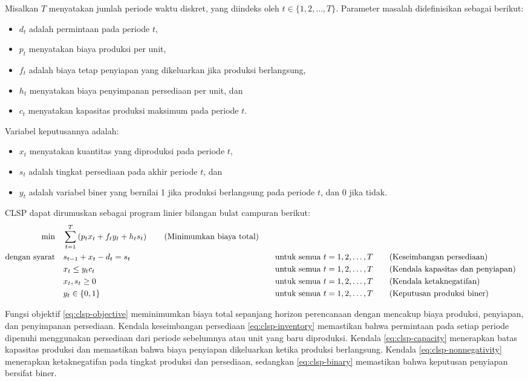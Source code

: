 Misalkan \( T \) menyatakan jumlah periode waktu diskret, yang diindeks oleh \( t \in \{1,2,\dots,T\} \). Parameter masalah didefinisikan sebagai berikut:
\begin{itemize}
    \item \( d_t \) adalah permintaan pada periode \( t \),
    \item \( p_t \) menyatakan biaya produksi per unit,
    \item \( f_t \) adalah biaya tetap penyiapan yang dikeluarkan jika produksi berlangsung,
    \item \( h_t \) menyatakan biaya penyimpanan persediaan per unit, dan
    \item \( c_t \) menyatakan kapasitas produksi maksimum pada periode \( t \).
\end{itemize}

Variabel keputusannya adalah:
\begin{itemize}
    \item \( x_t \) menyatakan kuantitas yang diproduksi pada periode \( t \),
    \item \( s_t \) adalah tingkat persediaan pada akhir periode \( t \), dan
    \item \( y_t \) adalah variabel biner yang bernilai 1 jika produksi berlangsung pada periode \( t \), dan 0 jika tidak.
\end{itemize}

CLSP dapat dirumuskan sebagai program linier bilangan bulat campuran berikut:
\begin{align}
\min \quad & \sum_{t=1}^{T} \left( p_t x_t + f_t y_t + h_t s_t \right)   \tag{Minimumkan biaya total}\label{eq:clsp-objective} \\
\mbox{dengan syarat}\quad        & s_{t-1} + x_t - d_t = s_t &&\quad \mbox{untuk semua } t = 1,2,\dots,T   \tag{Keseimbangan persediaan}\label{eq:clsp-inventory} \\
    & x_t \leq y_t c_t &&\quad \mbox{untuk semua } t = 1,2,\dots,T   \tag{Kendala kapasitas dan penyiapan}\label{eq:clsp-capacity} \\
    & x_t, s_t \geq 0 &&\quad \mbox{untuk semua } t = 1,2,\dots,T   \tag{Kendala ketaknegatifan}\label{eq:clsp-nonnegativity} \\
    & y_t \in \{0,1\} &&\quad \mbox{untuk semua } t = 1,2,\dots,T   \tag{Keputusan produksi biner}\label{eq:clsp-binary}
\end{align}

Fungsi objektif \eqref{eq:clsp-objective} meminimumkan biaya total sepanjang horizon perencanaan dengan mencakup biaya produksi, penyiapan, dan penyimpanan persediaan. Kendala keseimbangan persediaan \eqref{eq:clsp-inventory} memastikan bahwa permintaan pada setiap periode dipenuhi menggunakan persediaan dari periode sebelumnya atau unit yang baru diproduksi. Kendala \eqref{eq:clsp-capacity} menerapkan batas kapasitas produksi dan memastikan bahwa biaya penyiapan dikeluarkan ketika produksi berlangsung. Kendala \eqref{eq:clsp-nonnegativity} menerapkan ketaknegatifan pada tingkat produksi dan persediaan, sedangkan \eqref{eq:clsp-binary} memastikan bahwa keputusan penyiapan bersifat biner.

